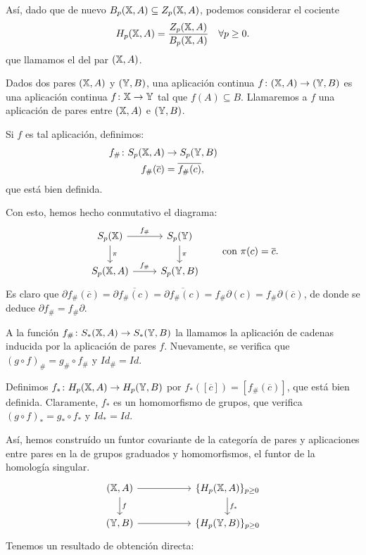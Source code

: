 Así, dado que de nuevo $B_p({\mathbb X}, A) \subseteq Z_p({\mathbb X}, A)$, podemos considerar el cociente
\[H_p({\mathbb X}, A) = \frac{Z_p({\mathbb X}, A)}{B_p({\mathbb X}, A)} \quad \forall p \geq 0. \]
que llamamos el \textbf{\underline{}} del par $({\mathbb X}, A)$.

Dados dos pares $({\mathbb X}, A)$ y $({\mathbb Y}, B)$, una aplicación continua $f \colon ({\mathbb X}, A) \to ({\mathbb Y}, B)$ es una aplicación continua
$f \colon {\mathbb X} \to {\mathbb Y}$ tal que $f(A) \subseteq B$. Llamaremos a $f$ una aplicación de pares entre $({\mathbb X}, A)$ e $({\mathbb Y}, B)$.

Si $f$ es tal aplicación, definimos:
\begin{align*}
  f_\# \colon S_p({\mathbb X}, A) &\to S_p({\mathbb Y}, B) \hspace{4em}\\
  f_\#(\overline{c}) &= \overline{f_\#(c)},
\end{align*}
que está bien definida.

Con esto, hemos hecho conmutativo el diagrama:
\[
\begin{tikzcd}
    S_p(\X) \arrow{r}{f_\#} \arrow{d}{\pi} & S_p(\Y) \arrow{d}{\pi} \\
    S_p(\X, A) \arrow{r}{f_\#} & S_p(\Y, B)
  \end{tikzcd}
  \hspace{2em} \text{con } \pi(c) = \overline{c}.
\]
Es claro que $\partial f_\#(\overline{c}) = \partial \overline{f_\#(c)} = \overline{\partial f_\#(c)} = f_\# \partial(c) = f_\# \partial(\overline{c})$,
de donde se deduce $\partial f_\# = f_\# \partial$.

A la función $f_\# \colon S_*({\mathbb X}, A) \to S_*({\mathbb Y}, B)$ la llamamos la aplicación de cadenas inducida por la aplicación de pares $f$.
Nuevamente, se verifica que $(g \circ f)_\# = g_\# \circ f_\#$ y $Id_\# = Id$.

Definimos $f_* \colon H_p({\mathbb X}, A) \to H_p({\mathbb Y}, B)$ por $f_*([\overline{c}]) = [f_\#(\overline{c})]$, que está bien definida.
Claramente, $f_*$ es un homomorfismo de grupos, que verifica $(g \circ f)_* = g_* \circ f_*$ y $Id_* = Id$.

Así, hemos construído un funtor covariante de la categoría de pares y aplicaciones entre pares en la de grupos graduados y homomorfismos,
el funtor de la homología singular.
\[
\begin{tikzcd}
  (\X, A) \arrow{r} \arrow{d}{f} & [3em] \{H_p(\X, A)\}_{p \geq 0} \arrow{d}{f_*} \\
  (\Y, B) \arrow{r} & \{H_p(\Y, B)\}_{p \geq 0}
\end{tikzcd}
\]
Tenemos un resultado de obtención directa:

